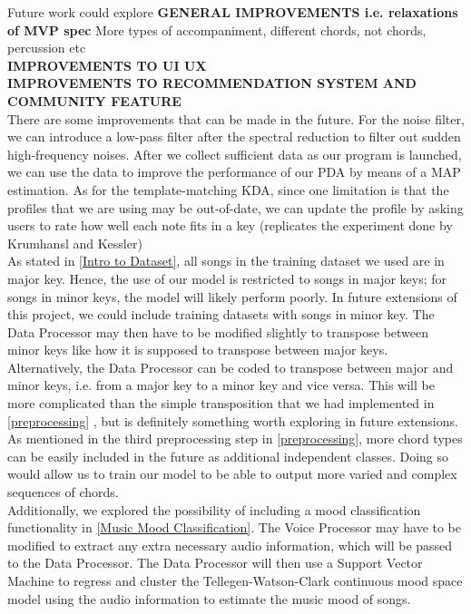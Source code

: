 Future work could explore
\textbf{GENERAL IMPROVEMENTS i.e. relaxations of MVP spec} 
More types of accompaniment, different chords, not chords, percussion etc\\
\textbf{IMPROVEMENTS TO UI UX} \\
\textbf{IMPROVEMENTS TO RECOMMENDATION SYSTEM AND COMMUNITY FEATURE}
\\
There are some improvements that can be made in the future. 
For the noise filter, we can introduce a low-pass filter after the spectral reduction to filter out sudden high-frequency noises. 
After we collect sufficient data as our program is launched, we can use the data to improve the performance of our PDA by means of a MAP estimation. 
As for the template-matching KDA, since one limitation is that the profiles that we are using may be out-of-date, we can update the profile by asking users to rate how well each note fits in a key (replicates the experiment done by Krumhansl and Kessler)
\\
As stated in \cref{Intro to Dataset}, all songs in the training dataset we used are in major key. 
Hence, the use of our model is restricted to songs in major keys; for songs in minor keys, the model will likely perform poorly. 
In future extensions of this project, we could include training datasets with songs in minor key.
The Data Processor may then have to be modified slightly to transpose between minor keys like how it is supposed to transpose between major keys. 
Alternatively, the Data Processor can be coded to transpose between major and minor keys, i.e. from a major key to a minor key and vice versa. 
This will be more complicated than the simple transposition that we had implemented in \cref{preprocessing} \cite{BasicMusicTheoryBook}, but is definitely something worth exploring in future extensions. 
\\
As mentioned in the third preprocessing step in \cref{preprocessing}, more chord types can be easily included in the future as additional independent classes. 
Doing so would allow us to train our model to be able to output more varied and complex sequences of chords.
\\
Additionally, we explored the possibility of including a mood classification functionality in \cref{Music Mood Classification}. 
The Voice Processor may have to be modified to extract any extra necessary audio information, which will be passed to the Data Processor. 
The Data Processor will then use a Support Vector Machine to regress and cluster the Tellegen-Watson-Clark continuous mood space model using the audio information to estimate the music mood of songs. 
